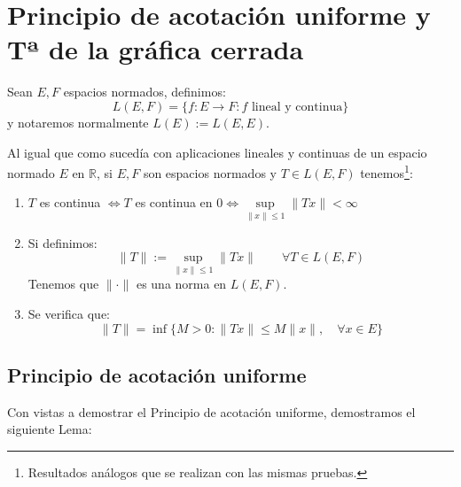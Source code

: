\chapter{Principio de acotación uniforme y Tª de la gráfica cerrada}

\begin{definicion}
    Sean $E,F$ espacios normados, definimos:
    \begin{equation*}
        L(E,F) = \{f:E\to F : f \text{\ lineal y continua}\}
    \end{equation*}
    y notaremos normalmente $L(E) := L(E,E)$.
\end{definicion}

\begin{prop}
    Al igual que como sucedía con aplicaciones lineales y continuas de un espacio normado $E$ en $\mathbb{R}$, si $E,F$ son espacios normados y $T\in L(E,F)$ tenemos\footnote{Resultados análogos que se realizan con las mismas pruebas.}:
    \begin{enumerate}
        \item $T$ es continua $\Longleftrightarrow T$ es continua en $0 \Longleftrightarrow \sup\limits_{\|x\|\leq 1}\|Tx\| < \infty$
        \item Si definimos:
            \begin{equation*}
                \|T\| := \sup_{\|x\|\leq 1}\|Tx\| \qquad \forall T\in L(E,F)
            \end{equation*}
            Tenemos que $\|\cdot \|$ es una norma en $L(E,F)$.
        \item Se verifica que:
            \begin{equation*}
                \|T\| = \inf\{M>0 : \|Tx\| \leq M\|x\|, \quad \forall x\in E\}
            \end{equation*}
    \end{enumerate}
\end{prop}

\section{Principio de acotación uniforme}
Con vistas a demostrar el Principio de acotación uniforme, demostramos el siguiente Lema:

